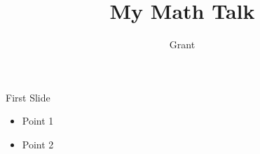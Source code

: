 \documentclass{beamer}
\title{My Math Talk}
\author{Grant}
\begin{document}
\frame{\titlepage}

\begin{frame}{First Slide}
    \begin{itemize}
        \item Point 1
        \item Point 2
    \end{itemize}
    \begin{center}
    \end{center}
\end{frame}
\end{document}
